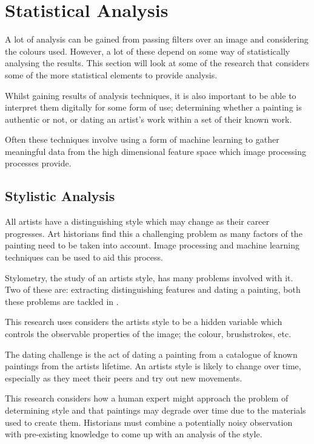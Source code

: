 \documentclass[conference]{IEEEtran}
\begin{document}
\section{Statistical Analysis}

A lot of analysis can be gained from passing filters over an image and
considering the colours used. However, a lot of these depend on some way of
statistically analysing the results. This section will look at some of the
research that considers some of the more statistical elements to provide
analysis.

Whilst gaining results of analysis techniques, it is also important to be able
to interpret them digitally for some form of use; determining whether a
painting is authentic or not, or dating an artist's work within a set of their
known work.

Often these techniques involve using a form of machine learning to gather
meaningful data from the high dimensional feature space which image processing
processes provide.

\subsection{Stylistic Analysis}

All artists have a distinguishing style which may change as their career
progresses. Art historians find this a challenging problem as many factors of
the painting need to be taken into account. Image processing and machine
learning techniques can be used to aid this process.

Stylometry, the study of an artists style, has many problems involved with it.
Two of these are: extracting distinguishing features and dating a
painting, both these problems are tackled in \cite{jafarpour2009stylistic}.

This research uses considers the artists style to be a hidden variable which
controls the observable properties of the image; the colour, brushstrokes, etc.

The dating challenge is the act of dating a painting from a catalogue of known
paintings from the artists lifetime. An artists style is likely to change over
time, especially as they meet their peers and try out new movements.

This research considers how a human expert might approach the problem of
determining style and that paintings may degrade over time due to the materials
used to create them. Historians must combine a potentially noisy observation
with pre-existing knowledge to come up with an analysis of the style.
\end{document}
